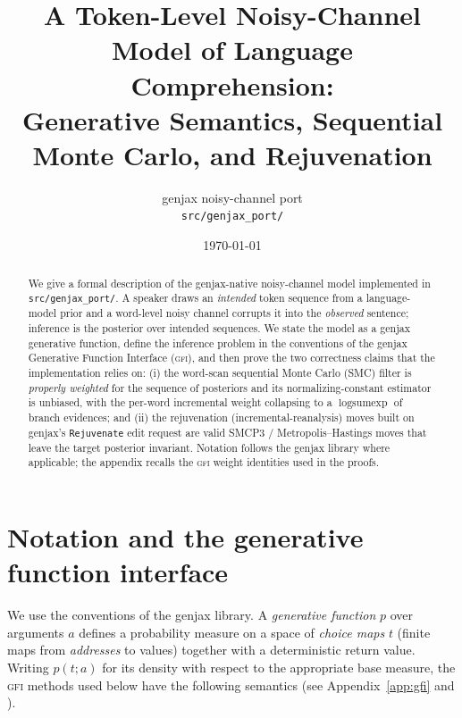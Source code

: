 \documentclass[11pt]{article}
\title{A Token-Level Noisy-Channel Model of Language Comprehension:\\
Generative Semantics, Sequential Monte Carlo, and Rejuvenation}
\author{genjax noisy-channel port \\ \small \texttt{src/genjax\_port/}}
\date{\today}
\newcommand{\GFI}{\textsc{gfi}}
\newcommand{\lse}{\operatorname{logsumexp}}
\newcommand{\code}[1]{\texttt{#1}}
\begin{document}
\maketitle

\begin{abstract}
We give a formal description of the genjax-native noisy-channel model implemented in
\code{src/genjax\_port/}. A speaker draws an \emph{intended} token sequence from a language-model
prior and a word-level noisy channel corrupts it into the \emph{observed} sentence; inference is
the posterior over intended sequences. We state the model as a genjax generative function, define
the inference problem in the conventions of the genjax Generative Function Interface (\GFI), and
then prove the two correctness claims that the implementation relies on: (i) the word-scan
sequential Monte Carlo (SMC) filter is \emph{properly weighted} for the sequence of posteriors and
its normalizing-constant estimator is unbiased, with the per-word incremental weight collapsing to
a $\lse$ of branch evidences; and (ii) the rejuvenation (incremental-reanalysis) moves built on
genjax's \code{Rejuvenate} edit request are valid SMCP3 / Metropolis--Hastings moves that leave the
target posterior invariant. Notation follows the genjax library where applicable; the appendix
recalls the \GFI{} weight identities used in the proofs.
\end{abstract}

\tableofcontents

\section{Notation and the generative function interface}
\label{sec:gfi}

We use the conventions of the genjax library. A \emph{generative function} $p$ over arguments
$a$ defines a probability measure on a space of \emph{choice maps} $t$ (finite maps from
\emph{addresses} to values) together with a deterministic return value. Writing $p(t; a)$ for its
density with respect to the appropriate base measure, the \GFI{} methods used below have the
following semantics (see Appendix~\ref{app:gfi} and \cite{genjax,gen}).
\end{document}
